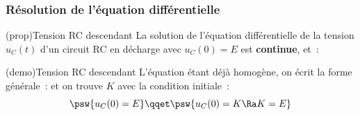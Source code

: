 \documentclass[../../main/main.tex]{subfiles}
\begin{document}
\subsubsection{Résolution de l'équation différentielle}
\begin{tcb*}[label=prop:ucsolu](prop){Tension RC descendant}
	La solution de l'équation différentielle de la tension $u_C(t)$
	d'un circuit RC en décharge avec $u_C(0) = E$ est \textbf{continue}, et~:
	\psw{%
		\[\boxed{u_C(t) = E\exp\left(-\frac{t}{\tau}\right)}\]
	}%
\end{tcb*}
\begin{tcb*}[label=demo:rcsolu](demo){Tension RC descendant}
	L'équation étant déjà homogène, on écrit la forme générale~:
	\psw{%
		\[u_C(t) = K\exp\left( -\frac{t}{\tau} \right)\]
	}%
	et on trouve $K$ avec la condition initiale~:
	\[
		\psw{u_C(0) = E}
		\qqet
		\psw{u_C(0) = K \Ra K=E}
	\]
\end{tcb*}
\end{document}
